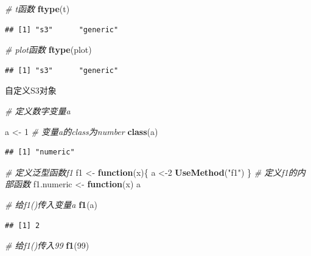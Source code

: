 \documentclass[]{book}
\newenvironment{Shaded}{\begin{snugshade}}{\end{snugshade}}
\newcommand{\KeywordTok}[1]{\textcolor[rgb]{0.13,0.29,0.53}{\textbf{#1}}}
\newcommand{\DecValTok}[1]{\textcolor[rgb]{0.00,0.00,0.81}{#1}}
\newcommand{\StringTok}[1]{\textcolor[rgb]{0.31,0.60,0.02}{#1}}
\newcommand{\CommentTok}[1]{\textcolor[rgb]{0.56,0.35,0.01}{\textit{#1}}}
\newcommand{\ControlFlowTok}[1]{\textcolor[rgb]{0.13,0.29,0.53}{\textbf{#1}}}
\newcommand{\NormalTok}[1]{#1}
\begin{document}
\begin{Shaded}
\begin{Highlighting}[]
\CommentTok{# t函数}
\KeywordTok{ftype}\NormalTok{(t)}
\end{Highlighting}
\end{Shaded}

\begin{verbatim}
## [1] "s3"      "generic"
\end{verbatim}

\begin{Shaded}
\begin{Highlighting}[]
\CommentTok{# plot函数}
\KeywordTok{ftype}\NormalTok{(plot)}
\end{Highlighting}
\end{Shaded}

\begin{verbatim}
## [1] "s3"      "generic"
\end{verbatim}

自定义S3对象

\begin{Shaded}
\begin{Highlighting}[]
\CommentTok{# 定义数字变量a}

\NormalTok{a <-}\StringTok{ }\DecValTok{1}
\CommentTok{# 变量a的class为number}
\KeywordTok{class}\NormalTok{(a)}
\end{Highlighting}
\end{Shaded}

\begin{verbatim}
## [1] "numeric"
\end{verbatim}

\begin{Shaded}
\begin{Highlighting}[]
\CommentTok{# 定义泛型函数f1}
\NormalTok{f1 <-}\StringTok{ }\ControlFlowTok{function}\NormalTok{(x)\{}
\NormalTok{  a <-}\DecValTok{2}
  \KeywordTok{UseMethod}\NormalTok{(}\StringTok{"f1"}\NormalTok{)}
\NormalTok{\}}
\CommentTok{# 定义f1的内部函数}
\NormalTok{f1.numeric <-}\StringTok{ }\ControlFlowTok{function}\NormalTok{(x) a}

\CommentTok{# 给f1()传入变量a}
\KeywordTok{f1}\NormalTok{(a)}
\end{Highlighting}
\end{Shaded}

\begin{verbatim}
## [1] 2
\end{verbatim}

\begin{Shaded}
\begin{Highlighting}[]
\CommentTok{# 给f1()传入99}
\KeywordTok{f1}\NormalTok{(}\DecValTok{99}\NormalTok{)}
\end{Highlighting}
\end{Shaded}
\end{document}
